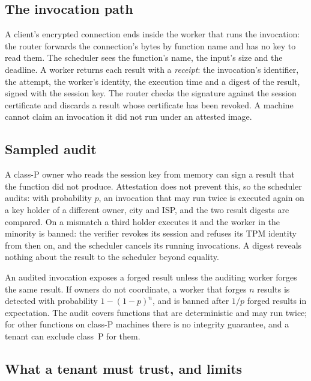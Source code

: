 \subsection{The invocation path}
\label{sec:path}

A client's encrypted connection ends inside the worker that runs the invocation: the router forwards the
connection's bytes by function name and has no key to read them. The scheduler sees the function's
name, the input's size and the deadline. A worker returns each result with a \emph{receipt}: the invocation's
identifier, the attempt, the worker's identity, the execution time and a digest of the result, signed with the session
key. The router checks the signature against the session certificate and discards a result whose certificate has been
revoked. A machine cannot claim an invocation it did not run under an attested image.

\subsection{Sampled audit}
\label{sec:audit}

A class-P owner who reads the session key from memory can sign a result that the function did not produce.
Attestation does not prevent this, so the scheduler audits: with probability $p$, an invocation that may run twice is
executed again on a key holder of a different owner, city and ISP, and the two result digests are compared. On a
mismatch a third holder executes it and the worker in the minority is banned: the verifier revokes its session and
refuses its TPM identity from then on, and the scheduler cancels its running invocations. A digest reveals nothing
about the result to the scheduler beyond equality.

An audited invocation exposes a forged result unless the auditing worker forges the same result. If owners do not
coordinate, a worker that forges $n$ results is detected with probability $1-(1-p)^n$, and is banned after $1/p$
forged results in expectation. The audit covers functions that are deterministic and may run twice; for other
functions on class-P machines there is no integrity guarantee, and a tenant can exclude class~P for them.

\subsection{What a tenant must trust, and limits}
\label{sec:limits-trust}


